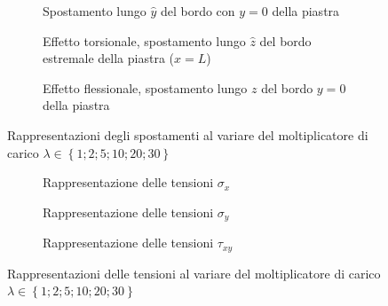 \documentclass[a4paper,num-refs]{oup-contemporary}
\begin{document}
\begin{figure}[bt!]
	\centering
	
	\begin{subfigure}[t]{0.3\textwidth}
		\centering
		\caption{Spostamento lungo $\hat y$ del bordo con $y=0$ della piastra}
		
	\end{subfigure}
	\hfill
	\begin{subfigure}[t]{0.3\textwidth}
		\centering
		
		\caption{Effetto torsionale, spostamento lungo $\hat z$ del bordo estremale della piastra ($x=L$)}
		
	\end{subfigure}
	\hfill
	\begin{subfigure}[t]{0.3\textwidth}
		\centering
		\caption{Effetto flessionale, spostamento lungo $z$ del bordo $y=0$ della piastra}
	\end{subfigure}
	\hfill
	\caption{Rappresentazioni degli spostamenti al variare del moltiplicatore di carico $\lambda \in \left\{1; 2; 5;10;20;30\right\}$}
	\label{fig:last_layer}
	
	\centering
	
	\begin{subfigure}[t]{0.3\textwidth}
		\centering
		\caption {Rappresentazione delle tensioni $\sigma_x$}
				\label{fig:sigma_x}
	\end{subfigure}
	\hfill
	\begin{subfigure}[t]{0.3\textwidth}
		\centering
		
		\caption{Rappresentazione delle tensioni $\sigma_y$}
		
	\end{subfigure}
	\hfill
	\begin{subfigure}[t]{0.3\textwidth}
		\centering
		\caption{Rappresentazione delle tensioni $\tau_{xy}$}
			\label{fig:stress}
	\end{subfigure}
	\hfill
	\caption{Rappresentazioni delle tensioni al variare del moltiplicatore di carico $\lambda \in \left\{1; 2; 5;10;20;30\right\}$}

\end{figure}
\end{document}
